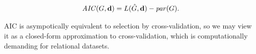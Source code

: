 \documentclass{article}
\begin{document}
$$\mathit{AIC}(G,\mathbf{d}) = L(\hat{G},\mathbf{d}) - \mathit{par}(G). $$

 AIC is asympotically equivalent to selection by cross-validation, so we may view it as a closed-form approximation to cross-validation,  which is computationally demanding for relational datasets. 

%
%
%
\end{document}
